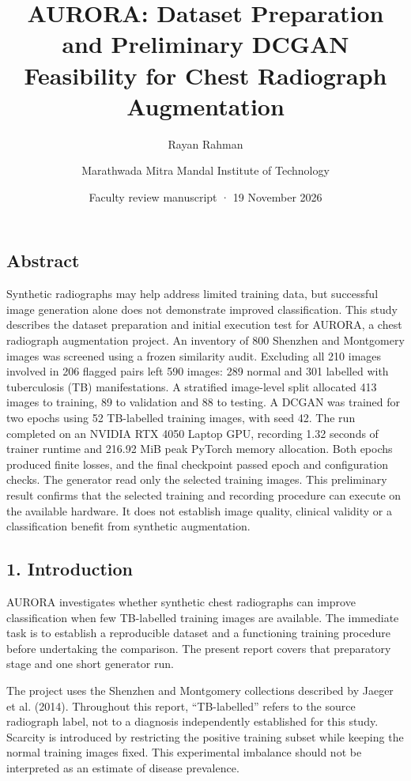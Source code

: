 \documentclass[
]{article}
\title{AURORA: Dataset Preparation and Preliminary DCGAN Feasibility for
Chest Radiograph Augmentation}
\author{Rayan Rahman \and Marathwada Mitra Mandal Institute of
Technology}
\date{Faculty review manuscript · 19 November 2026}
\begin{document}
\maketitle

\subsection{Abstract}\label{abstract}

Synthetic radiographs may help address limited training data, but
successful image generation alone does not demonstrate improved
classification. This study describes the dataset preparation and initial
execution test for AURORA, a chest radiograph augmentation project. An
inventory of 800 Shenzhen and Montgomery images was screened using a
frozen similarity audit. Excluding all 210 images involved in 206
flagged pairs left 590 images: 289 normal and 301 labelled with
tuberculosis (TB) manifestations. A stratified image-level split
allocated 413 images to training, 89 to validation and 88 to testing. A
DCGAN was trained for two epochs using 52 TB-labelled training images,
with seed 42. The run completed on an NVIDIA RTX 4050 Laptop GPU,
recording 1.32 seconds of trainer runtime and 216.92 MiB peak PyTorch
memory allocation. Both epochs produced finite losses, and the final
checkpoint passed epoch and configuration checks. The generator read
only the selected training images. This preliminary result confirms that
the selected training and recording procedure can execute on the
available hardware. It does not establish image quality, clinical
validity or a classification benefit from synthetic augmentation.

\subsection{1. Introduction}\label{introduction}

AURORA investigates whether synthetic chest radiographs can improve
classification when few TB-labelled training images are available. The
immediate task is to establish a reproducible dataset and a functioning
training procedure before undertaking the comparison. The present report
covers that preparatory stage and one short generator run.

The project uses the Shenzhen and Montgomery collections described by
Jaeger et al. (2014). Throughout this report, ``TB-labelled'' refers to
the source radiograph label, not to a diagnosis independently
established for this study. Scarcity is introduced by restricting the
positive training subset while keeping the normal training images fixed.
This experimental imbalance should not be interpreted as an estimate of
disease prevalence.
\end{document}
